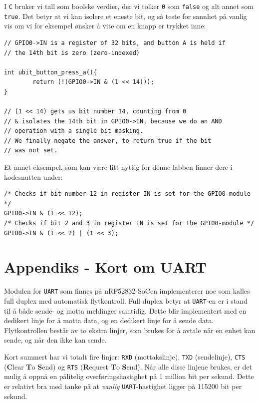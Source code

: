 I \verb|C| bruker vi tall som boolske verdier, der vi tolker \verb|0| som \verb|false| og alt annet som \verb|true|. Det betyr at vi kan isolere et eneste bit, og så teste for
sannhet på vanlig vis om vi for eksempel ønsker å vite om en knapp er trykket
inne:

\begin{lstlisting}
// GPIO0->IN is a register of 32 bits, and button A is held if
// the 14th bit is zero (zero-indexed)

int ubit_button_press_a(){
        return (!(GPIO0->IN & (1 << 14)));
}

// (1 << 14) gets us bit number 14, counting from 0
// & isolates the 14th bit in GPIO0->IN, because we do an AND
// operation with a single bit masking.
// We finally negate the answer, to return true if the bit
// was not set.
\end{lstlisting}
Et annet eksempel, som kan være litt nyttig for denne labben finner dere i kodesnutten under:

\begin{lstlisting}
/* Checks if bit number 12 in register IN is set for the GPIO0-module */
GPIO0->IN & (1 << 12);
/* Checks if bit 2 and 3 in register IN is set for the GPIO0-module */
GPIO0->IN & (1 << 2) | (1 << 3);
\end{lstlisting}



\section{Appendiks - Kort om UART}\label{app:uart}


Modulen for \verb|UART| som finnes på nRF52832-SoCen implementerer noe som kalles full duplex med automatisk flytkontroll. Full duplex betyr at \verb|UART|-en er i stand til å både sende- og motta meldinger samtidig. Dette blir implementert med en dedikert linje for å motta data, og en dedikert linje for å sende data. Flytkontrollen består av to ekstra linjer, som brukes for å avtale når en enhet kan sende, og når den ikke kan sende.

Kort summert har vi totalt fire linjer: \verb|RXD| (mottakslinje), \verb|TXD| (sendelinje), \verb|CTS| (\textbf{C}lear \textbf{T}o \textbf{S}end) og \verb|RTS| (\textbf{R}equest \textbf{T}o \textbf{S}end). Når alle disse linjene brukes, er det mulig å oppnå en pålitelig overføringshastighet på 1 million bit per sekund. Dette er relativt bra med tanke på at \textit{vanlig} \verb|UART|-hastighet ligger på 115200 bit per sekund.

